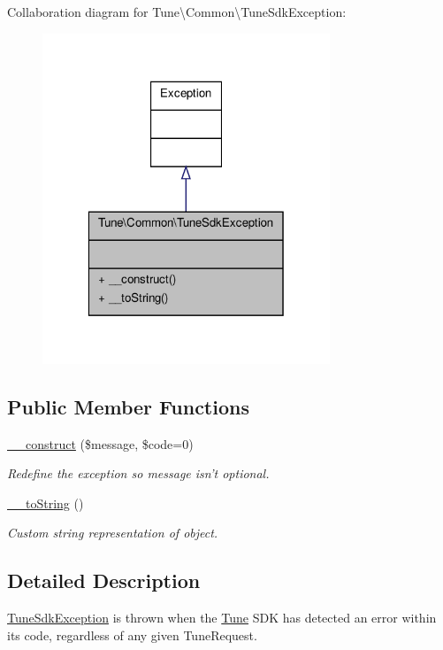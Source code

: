 Collaboration diagram for Tune\textbackslash{}Common\textbackslash{}Tune\-Sdk\-Exception\-:
\nopagebreak
\begin{figure}[H]
\begin{center}
\leavevmode
\includegraphics[width=244pt]{classTune_1_1Common_1_1TuneSdkException__coll__graph}
\end{center}
\end{figure}
\subsection*{Public Member Functions}
\begin{DoxyCompactItemize}
\item 
\hyperlink{classTune_1_1Common_1_1TuneSdkException_a7769d73422a9215bd8aee03591bc4157}{\-\_\-\-\_\-construct} (\$message, \$code=0)
\begin{DoxyCompactList}\small\item\em Redefine the exception so message isn't optional. \end{DoxyCompactList}\item 
\hyperlink{classTune_1_1Common_1_1TuneSdkException_a30681caf7644db2cfaba140f5f11fd35}{\-\_\-\-\_\-to\-String} ()
\begin{DoxyCompactList}\small\item\em Custom string representation of object. \end{DoxyCompactList}\end{DoxyCompactItemize}


\subsection{Detailed Description}
\hyperlink{classTune_1_1Common_1_1TuneSdkException}{Tune\-Sdk\-Exception} is thrown when the \hyperlink{namespaceTune}{Tune} S\-D\-K has detected an error within its code, regardless of any given Tune\-Request. 


